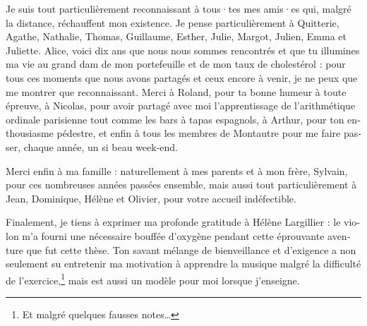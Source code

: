 \begin{french}
Je suis tout particulièrement reconnaissant à
tous·tes mes amis·es qui, malgré la distance, réchauffent mon existence.
Je pense particulièrement à Quitterie, Agathe, Nathalie, Thomas, Guillaume, Esther,
Julie, Margot, Julien, Emma et Juliette. 
Alice, voici dix ans que nous nous sommes rencontrés et que tu illumines ma vie
au grand dam de mon portefeuille et de mon taux de cholestérol : pour tous
ces moments que nous avons partagés et ceux encore à venir, je ne peux que me montrer que
reconnaissant. Merci à Roland, pour ta bonne humeur à toute épreuve,
à Nicolas, pour avoir partagé avec moi l'apprentissage de l'arithmétique ordinale parisienne
tout comme les bars à tapas espagnols, à Arthur, pour ton enthousiasme pédestre,
et enfin à tous les membres de Montautre pour me faire passer, chaque année,
un si beau week-end.

Merci enfin à ma famille : naturellement 
à mes parents et à mon frère, Sylvain, pour ces nombreuses années passées ensemble, 
mais aussi tout particulièrement à Jean, Dominique, Hélène et Olivier, pour votre accueil
indéfectible.

Finalement, je tiens à exprimer ma profonde gratitude à Hélène Largillier :
le violon m'a fourni une nécessaire bouffée d'oxygène pendant cette éprouvante aventure
que fut cette thèse. Ton savant mélange de bienveillance et d'exigence a non
seulement su entretenir ma motivation à apprendre la musique malgré la difficulté de
l'exercice,\footnote{Et malgré quelques fausses notes…} mais est aussi un modèle pour moi lorsque
j'enseigne.
\end{french}